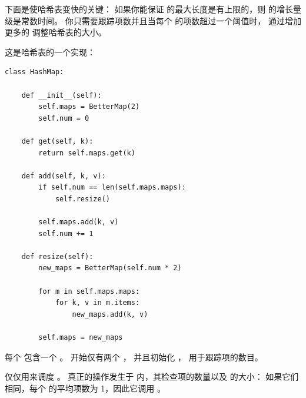 
下面是使哈希表变快的关键：
如果你能保证  的最大长度是有上限的，则  的增长量级是常数时间。
你只需要跟踪项数并且当每个  的项数超过一个阈值时，
通过增加更多的  调整哈希表的大小。


这是哈希表的一个实现：

\begin{lstlisting}
class HashMap:

    def __init__(self):
        self.maps = BetterMap(2)
        self.num = 0

    def get(self, k):
        return self.maps.get(k)

    def add(self, k, v):
        if self.num == len(self.maps.maps):
            self.resize()

        self.maps.add(k, v)
        self.num += 1

    def resize(self):
        new_maps = BetterMap(self.num * 2)

        for m in self.maps.maps:
            for k, v in m.items:
                new_maps.add(k, v)

        self.maps = new_maps
\end{lstlisting}


每个  包含一个 。
 开始仅有两个 ， 并且初始化 ， 用于跟踪项的数目。


 仅仅用来调度 。
真正的操作发生于  内，其检查项的数量以及  的大小：
如果它们相同，每个  的平均项数为 1，因此它调用 。

